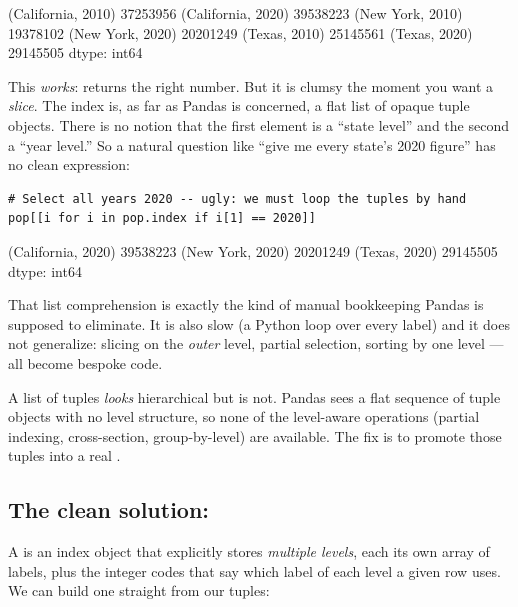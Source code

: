 \documentclass[11pt]{article}
\begin{document}
\begin{outblock}
(California, 2010)    37253956
(California, 2020)    39538223
(New York, 2010)      19378102
(New York, 2020)      20201249
(Texas, 2010)         25145561
(Texas, 2020)         29145505
dtype: int64
\end{outblock}

This \emph{works}:  returns the right number. But it is clumsy the moment you want a \emph{slice}. The index is, as far as Pandas is concerned, a flat list of opaque tuple objects. There is no notion that the first element is a ``state level'' and the second a ``year level.'' So a natural question like ``give me every state's 2020 figure'' has no clean expression:

\begin{lstlisting}
# Select all years 2020 -- ugly: we must loop the tuples by hand
pop[[i for i in pop.index if i[1] == 2020]]
\end{lstlisting}

\begin{outblock}
(California, 2020)    39538223
(New York, 2020)      20201249
(Texas, 2020)         29145505
dtype: int64
\end{outblock}

That list comprehension is exactly the kind of manual bookkeeping Pandas is supposed to eliminate. It is also slow (a Python loop over every label) and it does not generalize: slicing on the \emph{outer} level, partial selection, sorting by one level --- all become bespoke code.

\begin{keyidea}
A list of tuples \emph{looks} hierarchical but is not. Pandas sees a flat sequence of tuple objects with no level structure, so none of the level-aware operations (partial indexing, cross-section, group-by-level) are available. The fix is to promote those tuples into a real .
\end{keyidea}

\subsection{The clean solution: }

A  is an index object that explicitly stores \emph{multiple levels}, each its own array of labels, plus the integer codes that say which label of each level a given row uses. We can build one straight from our tuples:
\end{document}
